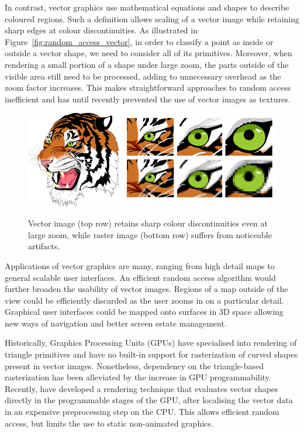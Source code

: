 \documentclass[11pt,a4paper,twoside]{article}
\begin{document}
In contrast, vector graphics use mathematical equations and shapes to describe coloured regions. Such a definition allows scaling of a vector image while retaining sharp edges at colour discontinuities. As illustrated in Figure~\ref{fig:random_access_vector}, in order to classify a point as inside or outside a vector shape, we need to consider all of its primitives. Moreover, when rendering a small portion of a shape under large zoom, the parts outside of the visible area still need to be processed, adding to unnecessary overhead as the zoom factor increases. This makes straightforward approaches to random access inefficient and has until recently prevented the use of vector images as textures.


\begin {figure}
	\centering
	\includegraphics[width=1.0\columnwidth] {figures/tiger_zoom} \label{fig:tiger_zoom}
	\caption {Vector image (top row) retains sharp colour discontinuities even at large zoom, while raster image (bottom row) suffers from noticeable artifacts.}
	\label {fig:zoom}
\end {figure}

Applications of vector graphics are many, ranging from high detail maps to general scalable user interfaces.  An efficient random access algorithm would further broaden the usability of vector images. Regions of a map outside of the view could be efficiently discarded as the user zooms in on a particular detail. Graphical user interfaces could be mapped onto surfaces in 3D space allowing new ways of navigation and better screen estate management.

Historically, Graphics Processing Units (GPUs) have specialised into rendering of triangle primitives and have no built-in support for rasterization of curved shapes present in vector images. Nonetheless, dependency on the triangle-based rasterization has been alleviated by the increase in GPU programmability. Recently, \cite{NehabHoppe08} have developed a rendering technique that evaluates vector shapes directly in the programmable stages of the GPU, after localising the vector data in an expensive preprocessing step on the CPU. This allows efficient random access, but limits the use to static non-animated graphics.
\end{document}
